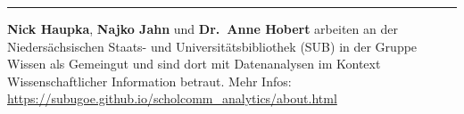 \begin{center}\rule{0.5\linewidth}{0.5pt}\end{center}

\textbf{Nick Haupka}, \textbf{Najko Jahn} und \textbf{Dr.~Anne Hobert}
arbeiten an der Niedersächsischen Staats- und Universitätsbibliothek
(SUB) in der Gruppe Wissen als Gemeingut und sind dort mit Datenanalysen
im Kontext Wissenschaftlicher Information betraut. Mehr Infos:
\url{https://subugoe.github.io/scholcomm_analytics/about.html}
